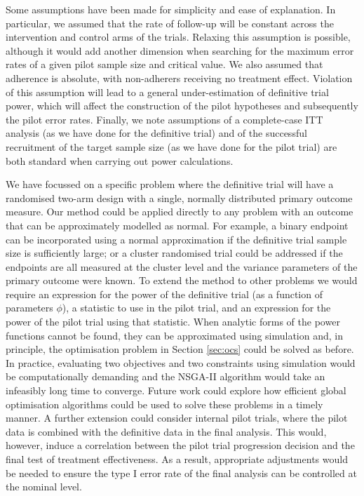 \documentclass[AMA,STIX1COL]{WileyNJD-v2}
\begin{document}

Some assumptions have been made for simplicity and ease of explanation. In particular, we assumed that the rate of follow-up will be constant across the intervention and control arms of the trials. Relaxing this assumption is possible, although it would add another dimension when searching for the maximum error rates of a given pilot sample size and critical value. We also assumed that adherence is absolute, with non-adherers receiving no treatment effect. Violation of this assumption will lead to a general under-estimation of definitive trial power, which will affect the construction of the pilot hypotheses and subsequently the pilot error rates. Finally, we note assumptions of a complete-case ITT analysis (as we have done for the definitive trial) and of the successful recruitment of the target sample size (as we have done for the pilot trial) are both standard when carrying out power calculations.


We have focussed on a specific problem where the definitive trial will have a randomised two-arm design with a single, normally distributed primary outcome measure. Our method could be applied directly to any problem with an outcome that can be approximately modelled as normal. For example, a binary endpoint can be incorporated using a normal approximation if the definitive trial sample size is sufficiently large; or a cluster randomised trial could be addressed if the endpoints are all measured at the cluster level and the variance parameters of the primary outcome were known. To extend the method to other problems we would require an expression for the power of the definitive trial (as a function of parameters $\phi$), a statistic to use in the pilot trial, and an expression for the power of the pilot trial using that statistic. When analytic forms of the power functions cannot be found, they can be approximated using simulation \cite{Landau2013} and, in principle, the optimisation problem in Section \ref{sec:ocs} could be solved as before. In practice, evaluating two objectives and two constraints using simulation would be computationally demanding and the NSGA-II algorithm would take an infeasibly long time to converge. Future work could explore how efficient global optimisation algorithms \cite{Jones2001} could be used to solve these problems in a timely manner. A further extension could consider internal pilot trials, where the pilot data is combined with the definitive data in the final analysis. This would, however, induce a correlation between the pilot trial progression decision and the final test of treatment effectiveness. As a result, appropriate adjustments would be needed to ensure the type I error rate of the final analysis can be controlled at the nominal level.
\end{document}

